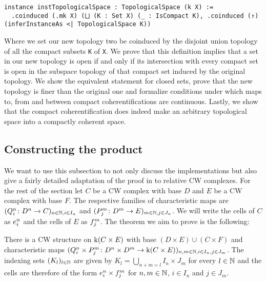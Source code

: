 \begin{lstlisting}[frame=single]
instance instTopologicalSpace : TopologicalSpace (k X) :=
  .coinduced (.mk X) (⨆ (K : Set X) (_ : IsCompact K), .coinduced (↑) (inferInstanceAs <| TopologicalSpace K))
\end{lstlisting}

Where we set our new topology two be coinduced by the disjoint union topology of all the compact subsets \lstinline|K| of \lstinline|X|. 
We prove that this definition implies that a set in our new topology is open if and only if its intersection with every compact set is open in the subspace topology of that compact set induced by the original topology. 
We show the equivalent statement for closed sets, prove that the new topology is finer than the original one and formalize conditions under which maps to, from and between compact coherentifications are continuous. 
Lastly, we show that the compact coherentification does indeed make an arbitrary topological space into a compactly coherent space. 

\subsection{Constructing the product}


We want to use this subsection to not only discuss the implementations but also give a fairly detailed adaptation of the proof in \cite{Hatcher2002} to relative CW complexes. 
For the rest of the section let $C$ be a CW complex with base $D$ and $E$ be a CW complex with base $F$.
The respective families of characteristic maps are $(Q_i^n \colon D^n \to C)_{n \in \bN, i \in I_n}$ and $(P_j^m \colon D^m \to E)_{m \in \bN, j \in J_n}$. 
We will write the cells of $C$ as $\openCell{n}{i}$ and the cells of $E$ as $\openCellf{m}{j}$.
The theorem we aim to prove is the following:

\begin{thm}\label{thm:product}
  There is a CW structure on $\kif (C \times E)$ with base $(D \times E) \cup (C \times F)$ and characteristic maps $(Q_i^n \times P_j^m \colon D^n \times D^m \to \kif(C \times E))_{n,m \in \bN,i \in I_n,j \in J_m}$.
  The indexing sets $(K_l)_{l \in \bN}$ are given by $K_l = \bigcup_{n + m = l}I_n \times J_m$ for every $l \in \bN$ and the cells are therefore of the form $\openCell{n}{i} \times \openCellf{m}{j}$ for $n, m \in \bN$, $i \in I_n$ and $j \in J_m$.
\end{thm}

